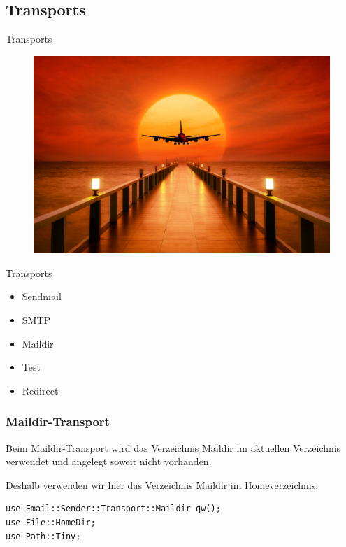 \subsection{Transports}

\begin{frame}{Transports}
  \begin{figure}[!ht]
    \centering
    \includegraphics[width=0.9\linewidth]{img/sunset-3193002_1920.jpg}
  \end{figure}
\end{frame}

\begin{frame}{Transports}
  \begin{itemize}
    \item Sendmail
    \item SMTP
    \item Maildir
    \item Test
    \item Redirect
  \end{itemize}
\end{frame}

\subsubsection{Maildir-Transport}

Beim Maildir-Transport wird das Verzeichnis Maildir im aktuellen Verzeichnis
verwendet und angelegt soweit nicht vorhanden.

Deshalb verwenden wir hier das Verzeichnis Maildir im Homeverzeichnis.

\begin{lstlisting}
use Email::Sender::Transport::Maildir qw();
use File::HomeDir;
use Path::Tiny;
\end{lstlisting}

